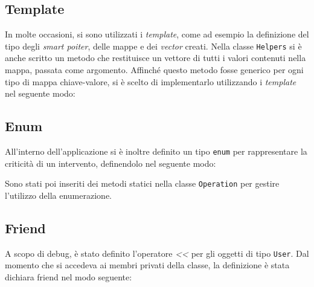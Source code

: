 \subsection{Template}
In molte occasioni, si sono utilizzati i \textit{template}, come ad esempio la definizione del tipo degli \textit{smart poiter}, delle mappe e dei \textit{vector} creati. Nella classe \texttt{Helpers} si è anche scritto un metodo che restituisce un vettore di tutti i valori contenuti nella mappa, passata come argomento. Affinché questo metodo fosse generico per ogni tipo di mappa chiave-valore, si è scelto di implementarlo utilizzando i \textit{template} nel seguente modo:


\subsection{Enum}
All'interno dell'applicazione si è inoltre definito un tipo \texttt{enum} per rappresentare la criticità di un intervento, definendolo nel seguente modo:

Sono stati poi inseriti dei metodi statici nella classe \texttt{Operation} per gestire l'utilizzo della enumerazione.

\subsection{Friend}
A scopo di debug, è stato definito l'operatore \textit{<<} per gli oggetti di tipo \texttt{User}. Dal momento che si accedeva ai membri privati della classe, la definizione è stata dichiara friend nel modo seguente:

